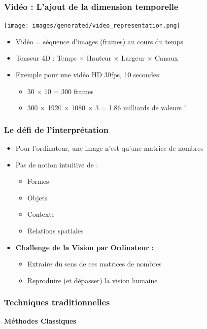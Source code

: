 \documentclass{beamer}
\begin{document}
\begin{frame}
    \frametitle{Vidéo : L'ajout de la dimension temporelle}
    \begin{center}
        \texttt{[image: images/generated/video\_representation.png]}
    \end{center}
    \begin{itemize}
        \item Vidéo = séquence d'images (frames) au cours du temps
        \item Tenseur 4D : Temps × Hauteur × Largeur × Canaux
        \item Exemple pour une vidéo HD 30fps, 10 secondes:
        \begin{itemize}
            \item 30 × 10 = 300 frames
            \item 300 × 1920 × 1080 × 3 = 1.86 milliards de valeurs !
        \end{itemize}
    \end{itemize}
\end{frame}

\begin{frame}
    \frametitle{Le défi de l'interprétation}
    \begin{itemize}
        \item Pour l'ordinateur, une image n'est qu'une matrice de nombres
        \item Pas de notion intuitive de :
        \begin{itemize}
            \item Formes
            \item Objets
            \item Contexte
            \item Relations spatiales
        \end{itemize}
        \item \textbf{Challenge de la Vision par Ordinateur :}
        \begin{itemize}
            \item Extraire du sens de ces matrices de nombres
            \item Reproduire (et dépasser) la vision humaine
        \end{itemize}
    \end{itemize}
\end{frame}

\begin{frame}
    \frametitle{Techniques traditionnelles}
    \begin{center}
        \Huge{\textbf{Méthodes Classiques}}
    \end{center}
\end{frame}
\end{document}
